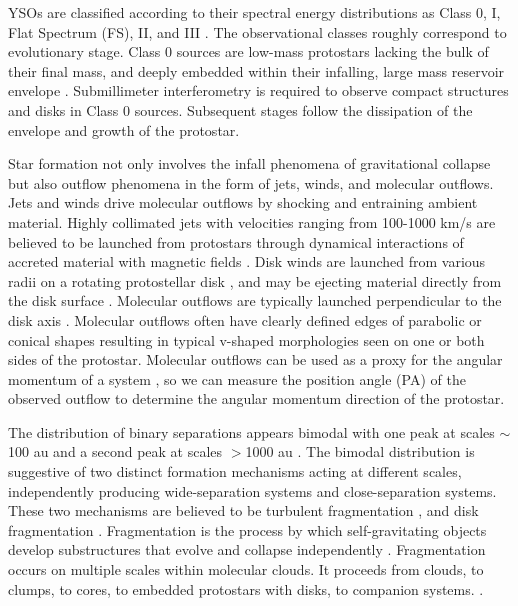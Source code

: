 \documentclass[linenumbers,twocolumn, twocolappendix]{aastex631}
\begin{document}
YSOs are classified according to their spectral energy distributions as Class 0, I, Flat Spectrum (FS), II, and III \citep{Lada&Wilking_1984, Adams_et_al_1987, Greene_et_al_1994, Andre_et_al_1993}. The observational classes roughly correspond to evolutionary stage. Class 0 sources are low-mass protostars lacking the bulk of their final mass, and deeply embedded within their infalling, large mass reservoir envelope \citep{Andre_et_al_1993}. Submillimeter interferometry is required to observe compact structures and disks in Class 0 sources. Subsequent stages follow the dissipation of the envelope and growth of the protostar.

Star formation not only involves the infall phenomena of gravitational collapse but also outflow phenomena in the form of jets, winds, and molecular outflows. Jets and winds drive molecular outflows by shocking and entraining ambient material. Highly collimated jets with velocities ranging from 100-1000 km/s are believed to be launched from protostars through dynamical interactions of accreted material with magnetic fields \citep[e.g.,][]{Frank_2014, Bally_2016}. Disk winds are launched from various radii on a rotating protostellar disk \citep[e.g.,][]{Feeney-Johansson_et_al_2024}, and may be ejecting material directly from the disk surface \citep{pascucci_2023}. Molecular outflows are typically launched perpendicular to the disk axis \cite[e.g.,][]{Hsieh_2023, Lee_et_al_2016}. Molecular outflows often have clearly defined edges of parabolic or conical shapes resulting in typical v-shaped morphologies seen on one or both sides of the protostar. Molecular outflows can be used as a proxy for the angular momentum of a system \citep[e.g.,][]{Offner_et_al_2016}, so we can measure the position angle (PA) of the observed outflow to determine the angular momentum direction of the protostar.

The distribution of binary separations appears bimodal with one peak at scales $\sim$100 au and a second peak at scales $>$1000 au \citep{Tobin_et_al_2016, Tobin_et_al_2022}. The bimodal distribution is suggestive of two distinct formation mechanisms acting at different scales, independently producing wide-separation systems and close-separation systems. These two mechanisms are believed to be turbulent fragmentation \citep{Tohline_2002, Offner_et_al_2023, Offner_et_al_2010}, and disk fragmentation \citep{Tohline_2002, Kratter&Lodado_2016}. Fragmentation is the process by which self-gravitating objects develop substructures that evolve and collapse independently \citep{Offner_et_al_2023}. Fragmentation occurs on multiple scales within molecular clouds. It proceeds from clouds, to clumps, to cores, to embedded protostars with disks, to companion systems. \citep{Pokhrel_et_al_2018}. 
\end{document}
